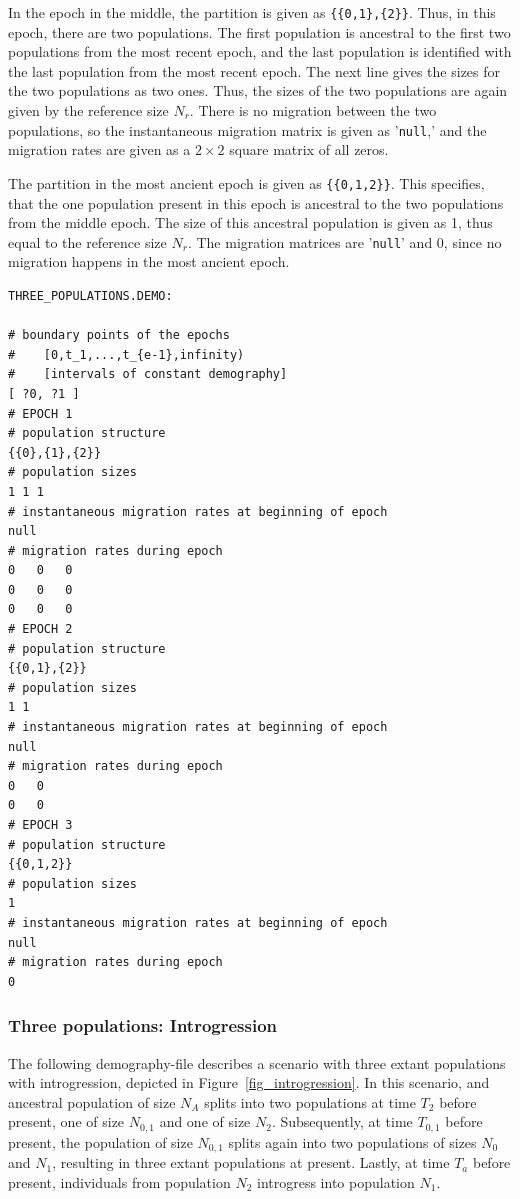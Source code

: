 \documentclass{article}
\numberwithin{equation}{section}
\begin{document}
In the epoch in the middle, the partition is given as \texttt{\{\{0,1\},\{2\}\}}. Thus, in this epoch, there are two populations. The first population is ancestral to the first two populations from the most recent epoch, and the last population is identified with the last population from the most recent epoch. The next line gives the sizes for the two populations as two ones. Thus, the sizes of the two populations are again given by the reference size $N_r$. There is no migration between the two populations, so the instantaneous migration matrix is given as '\texttt{null},' and the migration rates are given as a $2 \times 2$ square matrix of all zeros.

The partition in the most ancient epoch is given as \texttt{\{\{0,1,2\}\}}. This specifies, that the one population present in this epoch is ancestral to the two populations from the middle epoch. The size of this ancestral population is given as 1, thus equal to the reference size $N_r$. The migration matrices are '\texttt{null}' and 0, since no migration happens in the most ancient epoch.

\begin{verbatim}
THREE_POPULATIONS.DEMO:

# boundary points of the epochs
#    [0,t_1,...,t_{e-1},infinity)
#    [intervals of constant demography]
[ ?0, ?1 ]
# EPOCH 1
# population structure
{{0},{1},{2}}
# population sizes
1 1 1
# instantaneous migration rates at beginning of epoch
null
# migration rates during epoch
0	0	0
0	0	0
0	0	0
# EPOCH 2
# population structure
{{0,1},{2}}
# population sizes
1 1
# instantaneous migration rates at beginning of epoch
null
# migration rates during epoch
0	0
0	0
# EPOCH 3
# population structure
{{0,1,2}}
# population sizes
1
# instantaneous migration rates at beginning of epoch
null
# migration rates during epoch
0
\end{verbatim}

\subsubsection{Three populations: Introgression}
\label{sec_demo_introgression}


The following demography-file describes a scenario with three extant populations with introgression, depicted in Figure~\ref{fig_introgression}. In this scenario, and ancestral population of size $N_A$ splits into two populations at time $T_2$ before present, one of size $N_{0,1}$ and one of size $N_2$. Subsequently, at time $T_{0,1}$ before present, the population of size $N_{0,1}$ splits again into two populations of sizes $N_0$ and $N_1$, resulting in three extant populations at present. Lastly, at time $T_a$ before present, individuals from population $N_2$ introgress into population $N_1$.
\end{document}
